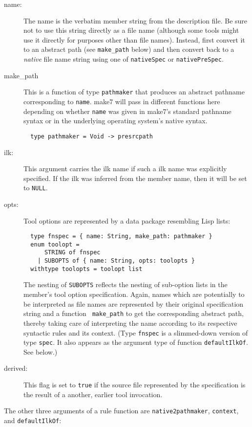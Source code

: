 \begin{description}
\item[name:] The name is the verbatim member string from the
description file.  Be sure not to use this string directly as a file
name (although some tools might use it directly for purposes other
than file names).  Instead, first convert it to an abstract path (see
{\tt make_path} below) and then convert back to a {\em native} file name
string using one of {\tt nativeSpec} or {\tt nativePreSpec}.
\item[make_path] This is a function of type {\tt pathmaker} that produces
an abstract pathname corresponding to {\tt name}.  make7 will pass in different
functions here depending on whether {\tt name} was given in make7's
standard pathname syntax or in the underlying operating system's
native syntax.
\begin{verbatim}
  type pathmaker = Void -> presrcpath
\end{verbatim}
\item[ilk:] This argument carries the ilk name if such a ilk
name was explicitly specified.  If the ilk was inferred from the
member name, then it will be set to {\tt NULL}.
\item[opts:] Tool options are represented by a data package
resembling Lisp lists:
\begin{verbatim}
  type fnspec = { name: String, make_path: pathmaker }
  enum toolopt =
      STRING of fnspec
    | SUBOPTS of { name: String, opts: toolopts }
  withtype toolopts = toolopt list
\end{verbatim}
The nesting of {\tt SUBOPTS} reflects the nesting of sub-option lists
in the member's tool option specification.
Again, names which are potentially to be interpreted as file names are
represented by their original specification string and a function {\tt
make_path} to get the corresponding abstract path, thereby taking
care of interpreting the name according to its respective syntactic
rules and its context. (Type {\tt fnspec} is a slimmed-down version of
type {\tt spec}.  It also appears as the argument type of function
{\tt defaultIlkOf}.  See below.)
\item[derived:] This flag is set to {\tt true} if the source file
represented by the specification is the result of a another, earlier
tool invocation.
\end{description}

The other three arguments of a rule function are {\tt native2pathmaker},
{\tt context}, and {\tt defaultIlkOf}:

